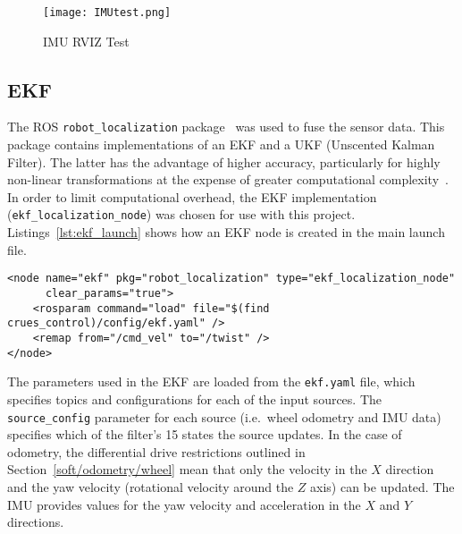 \begin{figure}[!ht]
	\centering
	\texttt{[image: IMUtest.png]}
	\caption{IMU RVIZ Test}\label{fig:imu_test}
\end{figure}

\subsection{EKF}\label{soft/odometry/ekf}

The ROS \verb|robot_localization| package~\cite{RosRobotLocalization} was used
to fuse the sensor data. This package contains implementations of
an EKF and a UKF (Unscented Kalman Filter). The latter has the advantage of higher
accuracy, particularly for highly non-linear transformations at the expense of
greater computational complexity~\cite{wan_unscented_2000}. In order to limit
computational overhead, the EKF implementation (\verb|ekf_localization_node|) was
chosen for use with this project. Listings~\ref{lst:ekf_launch} shows how an EKF
node is created in the main launch file.

\begin{lstlisting}[caption={EKF node in ROS launch file}, label={lst:ekf_launch}, style=xml]
<node name="ekf" pkg="robot_localization" type="ekf_localization_node"
      clear_params="true">
    <rosparam command="load" file="$(find crues_control)/config/ekf.yaml" />
    <remap from="/cmd_vel" to="/twist" />
</node>
\end{lstlisting}

The parameters used in the EKF are loaded from the \verb|ekf.yaml| file, which
specifies topics and configurations for each of the input sources. The
\verb|source_config| parameter for each source (i.e.\ wheel odometry and IMU data)
specifies which of the filter's 15 states the source updates. In the case of
odometry, the differential drive restrictions outlined in
Section~\ref{soft/odometry/wheel} mean that only the velocity in the $X$ direction
and the yaw velocity (rotational velocity around the $Z$ axis) can be updated.
The IMU provides values for the yaw velocity and acceleration in the $X$ and
$Y$ directions.

